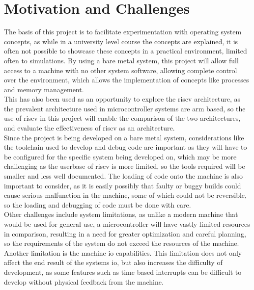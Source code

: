 \section{Motivation and Challenges}
The basis of this project is to facilitate experimentation with operating system concepts, as while in a university level course the concepts are explained, it is often not possible to showcase these concepts in a practical environment, limited often to simulations. By using a bare metal system, this project will allow full access to a machine with no other system software, allowing complete control over the environment, which allows the implementation of concepts like processes and memory management. \\
This has also been used as an opportunity to explore the \gls{riscv} architecture, as the prevalent architecture used in microcontroller systems are \gls{arm} based, so the use of \gls{riscv} in this project will enable the comparison of the two architectures, and evaluate the effectiveness of \gls{riscv} as an architecture.\\
Since the project is being developed on a bare metal system, considerations like the toolchain used to develop and debug code are important as they will have to be configured for the specific system being developed on, which may be more challenging as the userbase of \gls{riscv} is more limited, so the tools required will be smaller and less well documented. The loading of code onto the machine is also important to consider, as it is easily possibly that faulty or buggy builds could cause serious malfunction in the machine, some of which could not be reversible, so the loading and debugging of code must be done with care.\\
Other challenges include system limitations, as unlike a modern machine that would be used for general use, a microcontroller will have vastly limited resources in comparison, resulting in a need for greater optimization and careful planning, so the requirements of the system do not exceed the resources of the machine. Another limitation is the machine \ac{io} capabilities. This limitation does not only affect the end result of the systems \ac{io}, but also increases the difficulty of development, as some features such as time based interrupts can be difficult to develop without physical feedback from the machine.


